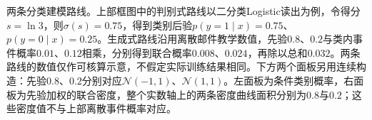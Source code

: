 两条分类建模路线。上部框图中的判别式路线以二分类Logistic读出为例，令得分$s=\ln3$，则$\sigma(s)=0.75$，得到类别后验$p(y=1\mid x)=0.75$、$p(y=0\mid x)=0.25$。生成式路线沿用离散邮件教学数值，先验$0.8$、$0.2$与类内事件概率$0.01$、$0.12$相乘，分别得到联合概率$0.008$、$0.024$，再除以总和$0.032$。两条路线的数值仅作可核算示意，不假定实际训练结果相同。下方两个面板另用连续构造：先验$0.8$、$0.2$分别对应$\mathcal N(-1,1)$、$\mathcal N(1,1)$。左面板为条件类别概率，右面板为先验加权的联合密度，整个实数轴上的两条密度曲线面积分别为$0.8$与$0.2$；这些密度值不与上部离散事件概率对应。
